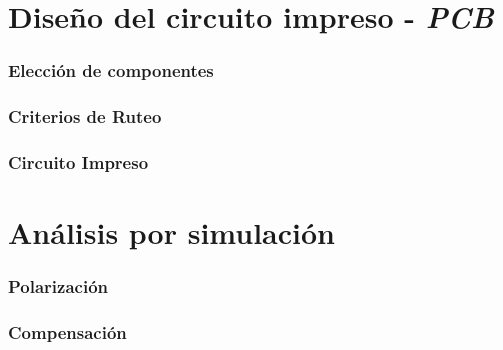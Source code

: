 \documentclass[10pt,a4paper]{article}
\begin{document}
	\part{Diseño del circuito impreso - \emph{PCB}}\label{part:pcb}

		\section{Elección de componentes}\label{sec:componentes}
			

		\section{Criterios de Ruteo}\label{sec:ruteo}
			

		\section{Circuito Impreso}
			
	\pagebreak
	\part{Análisis por simulación}\label{part:sim}
		
		\section{Polarización}\label{sec:sim_pol}
			
		
		\section{Compensación}\label{sec:sim_compensacion}
			
\end{document}
